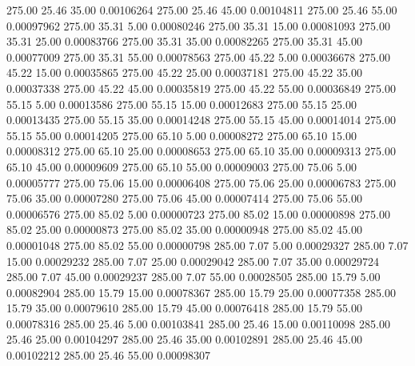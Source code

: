     275.00     25.46     35.00     0.00106264
    275.00     25.46     45.00     0.00104811
    275.00     25.46     55.00     0.00097962
    275.00     35.31      5.00     0.00080246
    275.00     35.31     15.00     0.00081093
    275.00     35.31     25.00     0.00083766
    275.00     35.31     35.00     0.00082265
    275.00     35.31     45.00     0.00077009
    275.00     35.31     55.00     0.00078563
    275.00     45.22      5.00     0.00036678
    275.00     45.22     15.00     0.00035865
    275.00     45.22     25.00     0.00037181
    275.00     45.22     35.00     0.00037338
    275.00     45.22     45.00     0.00035819
    275.00     45.22     55.00     0.00036849
    275.00     55.15      5.00     0.00013586
    275.00     55.15     15.00     0.00012683
    275.00     55.15     25.00     0.00013435
    275.00     55.15     35.00     0.00014248
    275.00     55.15     45.00     0.00014014
    275.00     55.15     55.00     0.00014205
    275.00     65.10      5.00     0.00008272
    275.00     65.10     15.00     0.00008312
    275.00     65.10     25.00     0.00008653
    275.00     65.10     35.00     0.00009313
    275.00     65.10     45.00     0.00009609
    275.00     65.10     55.00     0.00009003
    275.00     75.06      5.00     0.00005777
    275.00     75.06     15.00     0.00006408
    275.00     75.06     25.00     0.00006783
    275.00     75.06     35.00     0.00007280
    275.00     75.06     45.00     0.00007414
    275.00     75.06     55.00     0.00006576
    275.00     85.02      5.00     0.00000723
    275.00     85.02     15.00     0.00000898
    275.00     85.02     25.00     0.00000873
    275.00     85.02     35.00     0.00000948
    275.00     85.02     45.00     0.00001048
    275.00     85.02     55.00     0.00000798
    285.00      7.07      5.00     0.00029327
    285.00      7.07     15.00     0.00029232
    285.00      7.07     25.00     0.00029042
    285.00      7.07     35.00     0.00029724
    285.00      7.07     45.00     0.00029237
    285.00      7.07     55.00     0.00028505
    285.00     15.79      5.00     0.00082904
    285.00     15.79     15.00     0.00078367
    285.00     15.79     25.00     0.00077358
    285.00     15.79     35.00     0.00079610
    285.00     15.79     45.00     0.00076418
    285.00     15.79     55.00     0.00078316
    285.00     25.46      5.00     0.00103841
    285.00     25.46     15.00     0.00110098
    285.00     25.46     25.00     0.00104297
    285.00     25.46     35.00     0.00102891
    285.00     25.46     45.00     0.00102212
    285.00     25.46     55.00     0.00098307
